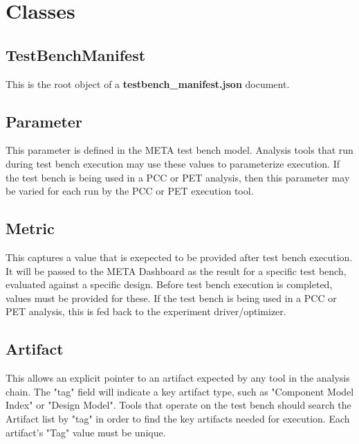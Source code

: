 \documentclass{article}
\begin{document}


\section{Classes}
\subsection{TestBenchManifest}
This is the root object of a \textbf{testbench\_manifest.json} document.
\subsection{Parameter}
This parameter is defined in the META test bench model. Analysis tools that run during test bench execution may use these values to parameterize execution. If the test bench is being used in a PCC or PET analysis, then this parameter may be varied for each run by the PCC or PET execution tool.
\subsection{Metric}
This captures a value that is exepected to be provided after test bench execution. It will be passed to the META Dashboard as the result for a specific test bench, evaluated against a specific design. Before test bench execution is completed, values must be provided for these. If the test bench is being used in a PCC or PET analysis, this is fed back to the experiment driver/optimizer.
\subsection{Artifact}
This allows an explicit pointer to an artifact expected by any tool in the analysis chain. The "tag" field will indicate a key artifact type, such as "Component Model Index" or "Design Model". Tools that operate on the test bench should search the Artifact list by "tag" in order to find the key artifacts needed for execution. Each artifact's "Tag" value must be unique.
\end{document}
